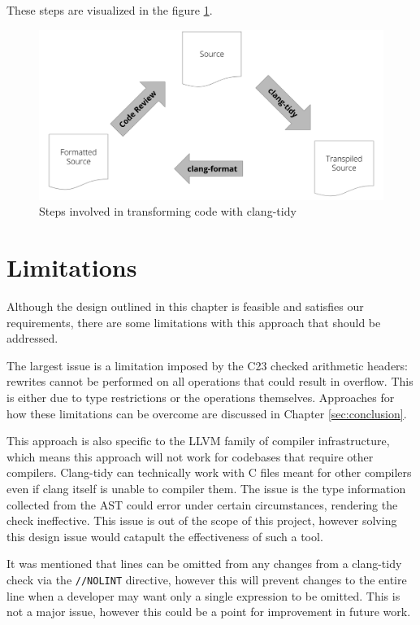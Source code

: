 These steps are visualized in the figure \ref{figure:clang-tidy}.

\begin{figure}
    \centering
        \includegraphics[width=1\textwidth]{source/Pictures/Screenshot 2025-04-25 122441.png}
        \caption{Steps involved in transforming code with clang-tidy}
        \label{figure:clang-tidy}
\end{figure}

\section{Limitations}

Although the design outlined in this chapter is feasible and satisfies our requirements, there are some limitations with this approach that should be addressed.

The largest issue is a limitation imposed by the C23 checked arithmetic headers: rewrites cannot be performed on all operations that could result in overflow. This is either due to type restrictions or the operations themselves. Approaches for how these limitations can be overcome are discussed in Chapter \ref{sec:conclusion}.

This approach is also specific to the LLVM family of compiler infrastructure, which means this approach will not work for codebases that require other compilers. Clang-tidy can technically work with C files meant for other compilers even if clang itself is unable to compiler them. The issue is the type information collected from the AST could error under certain circumstances, rendering the check ineffective. This issue is out of the scope of this project, however solving this design issue would catapult the effectiveness of such a tool.

It was mentioned that lines can be omitted from any changes from a clang-tidy check via the \texttt{//NOLINT} directive, however this will prevent changes to the entire line when a developer may want only a single expression to be omitted. This is not a major issue, however this could be a point for improvement in future work.

